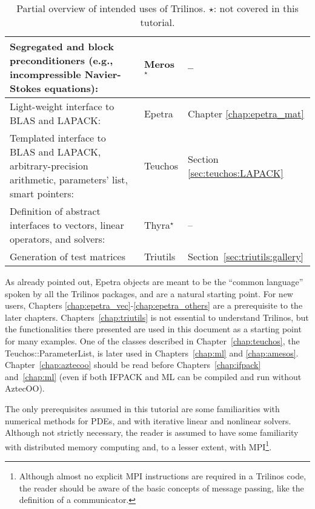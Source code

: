 \begin{table}[htbp]
\begin{tabular}{| p{8cm} | p{2.5cm} | p{3cm} |}
    Segregated and block preconditioners (e.g., incompressible
    Navier-Stokes equations):&
    Meros$^\star$ & -- \\
    \hline
    Light-weight interface to BLAS and LAPACK: & Epetra
    & Chapter \ref{chap:epetra_mat} \\
    \hline
    Templated interface to BLAS and LAPACK, arbitrary-precision
    arithmetic, parameters' list, smart pointers:& Teuchos &
    Section \ref{sec:teuchos:LAPACK} \\
    \hline
    Definition of abstract interfaces to vectors, linear operators, and
    solvers:& Thyra$^\star$ & --
    \\
    \hline
    Generation of test matrices & Triutils & Section~\ref{sec:triutils:gallery} \\
    \hline
  \end{tabular}
  \caption{Partial overview of intended uses of Trilinos. $\star$:
    not covered in this tutorial.}
  \label{tab:tripackages}
\end{table}

\begin{remark}
  As already pointed out, Epetra objects are meant to be the ``common
  language'' spoken by all the Trilinos packages, and are a natural
  starting point. For new users, Chapters
  \ref{chap:epetra_vec}-\ref{chap:epetra_others} are a prerequisite to
  the later chapters. Chapters~\ref{chap:triutils} is not essential to
  understand Trilinos, but the functionalities there presented are used
  in this document as a starting point for many examples.  One of the
  classes described in Chapter~\ref{chap:teuchos}, the
  Teuchos::ParameterList, is later used in Chapters~\ref{chap:ml} and
  \ref{chap:amesos}.  Chapter~\ref{chap:aztecoo} should be read before
  Chapters~\ref{chap:ifpack} and~\ref{chap:ml} (even if both IFPACK and
  ML can be compiled and run without AztecOO).
\end{remark}

The only prerequisites assumed in this tutorial are some familiarities
with numerical methods for PDEs, and with iterative linear and nonlinear
solvers. Although not strictly necessary, the reader is assumed to have
some familiarity with distributed memory computing and, to a lesser
extent, with MPI\footnote{Although almost no explicit MPI instructions
  are required in a Trilinos code, the reader should be aware of the
  basic concepts of message passing, like the definition of a
  communicator.}.

\smallskip

